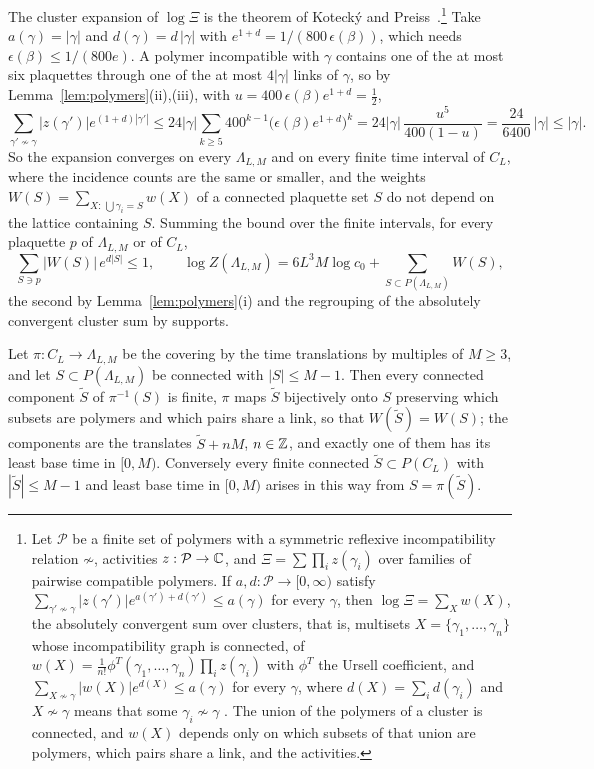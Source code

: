 The cluster expansion of $\log\Xi$ is the theorem of Koteck\'y and
Preiss~\cite{KP86}.\footnote{Let $\mathcal P$ be a finite set of polymers
with a symmetric reflexive incompatibility relation $\not\sim$, activities
$z:\mathcal P\to\mathbb{C}$, and $\Xi=\sum\prod_iz(\gamma_i)$ over families of
pairwise compatible polymers. If $a,d:\mathcal P\to[0,\infty)$ satisfy
$\sum_{\gamma'\not\sim\gamma}|z(\gamma')|e^{a(\gamma')+d(\gamma')}\le
a(\gamma)$ for every $\gamma$, then $\log\Xi=\sum_Xw(X)$, the absolutely
convergent sum over clusters, that is, multisets $X=\{\gamma_1,\dots,
\gamma_n\}$ whose incompatibility graph is connected, of $w(X)=
\frac1{n!}\phi^T(\gamma_1,\dots,\gamma_n)\prod_iz(\gamma_i)$ with $\phi^T$
the Ursell coefficient, and $\sum_{X\not\sim\gamma}|w(X)|e^{d(X)}\le
a(\gamma)$ for every $\gamma$, where $d(X)=\sum_id(\gamma_i)$ and $X\not\sim
\gamma$ means that some $\gamma_i\not\sim\gamma$ \cite[Theorem~1]{KP86}.
The union of the polymers of a cluster is connected, and $w(X)$ depends
only on which subsets of that union are polymers, which pairs share a
link, and the activities.} Take $a(\gamma)=|\gamma|$ and $d(\gamma)=
d\,|\gamma|$ with $e^{1+d}=1/(800\,\epsilon(\beta))$, which needs
$\epsilon(\beta)\le1/(800e)$. A polymer incompatible with $\gamma$ contains
one of the at most six plaquettes through one of the at most $4|\gamma|$
links of $\gamma$, so by Lemma~\ref{lem:polymers}(ii),(iii), with
$u=400\,\epsilon(\beta)e^{1+d}=\frac12$,
\[
\sum_{\gamma'\not\sim\gamma}|z(\gamma')|e^{(1+d)|\gamma'|}\le24|\gamma|
\sum_{k\ge5}400^{k-1}\bigl(\epsilon(\beta)e^{1+d}\bigr)^k=24|\gamma|\,
\frac{u^5}{400(1-u)}=\frac{24}{6400}\,|\gamma|\le|\gamma| .
\]
So the expansion converges on every $\Lambda_{L,M}$ and on every finite
time interval of $C_L$, where the incidence counts are the same or smaller,
and the weights $W(S)=\sum_{X:\,\bigcup\gamma_i=S}w(X)$ of a connected
plaquette set $S$ do not depend on the lattice containing $S$. Summing the
bound over the finite intervals, for every plaquette $p$ of $\Lambda_{L,M}$
or of $C_L$,
\begin{equation}\label{eq:KPbound}
\sum_{S\ni p}|W(S)|\,e^{d|S|}\le1,\qquad
\log Z(\Lambda_{L,M})=6L^3M\log c_0+\sum_{S\subset P(\Lambda_{L,M})}W(S),
\end{equation}
the second by Lemma~\ref{lem:polymers}(i) and the regrouping of the
absolutely convergent cluster sum by supports.

\begin{lemma}[winding]\label{lem:winding}
Let $\pi:C_L\to\Lambda_{L,M}$ be the covering by the time translations by
multiples of $M\ge3$, and let $S\subset P(\Lambda_{L,M})$ be connected with
$|S|\le M-1$. Then every connected component $\tilde S$ of $\pi^{-1}(S)$ is
finite, $\pi$ maps $\tilde S$ bijectively onto $S$ preserving which subsets
are polymers and which pairs share a link, so that $W(\tilde S)=W(S)$; the
components are the translates $\tilde S+nM$, $n\in\mathbb{Z}$, and exactly one of
them has its least base time in $[0,M)$. Conversely every finite connected
$\tilde S\subset P(C_L)$ with $|\tilde S|\le M-1$ and least base time in
$[0,M)$ arises in this way from $S=\pi(\tilde S)$.
\end{lemma}

